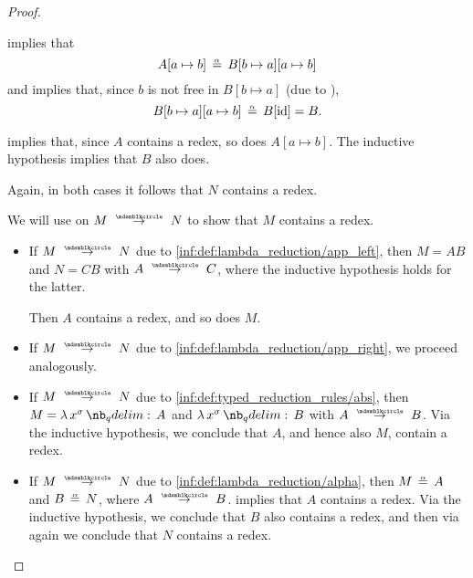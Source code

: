 \begin{proof}
\begin{itemize}
\begin{itemize}
       implies that
      \begin{equation*}
        A[a \mapsto b] \aequiv B[b \mapsto a][a \mapsto b]
      \end{equation*}
      and  implies that, since \( b \) is not free in \( B[b \mapsto a] \) (due to ),
      \begin{equation*}
        B[b \mapsto a][a \mapsto b] \aequiv B[\id] = B.
      \end{equation*}

       implies that, since \( A \) contains a redex, so does \( A[a \mapsto b] \). The inductive hypothesis implies that \( B \) also does.
    \end{itemize}

    Again, in both cases it follows that \( N \) contains a redex.
  \end{itemize}


  \SufficiencySubProof* We will use  on \( M \pred N \) to show that \( M \) contains a redex.

  \begin{itemize}
    \item If \( M \pred N \) due to \ref{inf:def:lambda_reduction/app_left}, then \( M = AB \) and \( N = CB \) with \( A \pred C \), where the inductive hypothesis holds for the latter.

    Then \( A \) contains a redex, and so does \( M \).

    \item If \( M \pred N \) due to \ref{inf:def:lambda_reduction/app_right}, we proceed analogously.

    \item If \( M \pred N \) due to \ref{inf:def:typed_reduction_rules/abs}, then \( M = \qabs {x^\sigma} A \) and \( \qabs {x^\sigma} B  \) with \( A \pred B \). Via the inductive hypothesis, we conclude that \( A \), and hence also \( M \), contain a redex.

    \item If \( M \pred N \) due to \ref{inf:def:lambda_reduction/alpha}, then \( M \aequiv A \) and \( B \aequiv N \), where \( A \pred B \).  implies that \( A \) contains a redex. Via the inductive hypothesis, we conclude that \( B \) also contains a redex, and then via  again we conclude that \( N \) contains a redex.


\end{itemize}
\end{proof}
